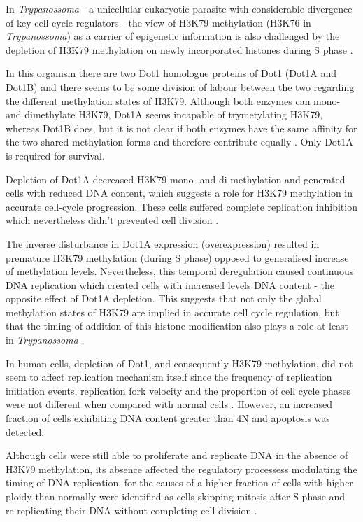\documentclass[11pt,twoside,a4paper]{report}
\begin{document}
		In \textit{Trypanossoma} - a unicellular eukaryotic parasite with considerable divergence of key cell cycle regulators - the view of H3K79 methylation (H3K76 in \textit{Trypanossoma}) as a carrier of epigenetic information is also challenged by the depletion of H3K79 methylation on newly incorporated histones during S phase \cite{Gassen2012}.
		
		In this organism there are two Dot1 homologue proteins of Dot1 (Dot1A and Dot1B) and there seems to be some division of labour between the two regarding the different methylation states of H3K79. Although both enzymes can mono- and dimethylate H3K79, Dot1A seems incapable of trymetylating H3K79, whereas Dot1B does, but it is not clear if both enzymes have the same affinity for the two shared methylation forms and therefore contribute equally \cite{Gassen2012}. Only Dot1A is required for survival.
	
		Depletion of Dot1A decreased H3K79 mono- and di-methylation and generated cells with reduced DNA content, which suggests a role for H3K79 methylation in accurate cell-cycle progression. These cells suffered complete replication inhibition which nevertheless didn't prevented cell division \cite{Gassen2012}.
		
		The inverse disturbance in Dot1A expression (overexpression) resulted in premature H3K79 methylation (during S phase) opposed to generalised increase of methylation levels. Nevertheless, this temporal deregulation caused continuous DNA replication which created cells with increased levels DNA content - the opposite effect of Dot1A depletion. This suggests that not only the global methylation states of H3K79 are implied in accurate cell cycle regulation, but that the timing of addition of this histone modification also plays a role at least in \textit{Trypanossoma} \cite{Gassen2012}.
		
		In human cells, depletion of Dot1, and consequently H3K79 methylation, did not seem to affect replication mechanism itself since the frequency of replication initiation events, replication fork velocity and the proportion of cell cycle phases were not different when compared with normal cells \cite{Fu2013a}. However, an increased fraction of cells exhibiting DNA content greater than 4N and apoptosis was detected.
		
		Although cells were still able to proliferate and replicate DNA in the absence of H3K79 methylation, its absence affected the regulatory processess modulating the timing of DNA replication, for the causes of a higher fraction of cells with higher ploidy than normally were identified as cells skipping mitosis after S phase and re-replicating their DNA without completing cell division \cite{Fu2013a}.
		
\end{document}
